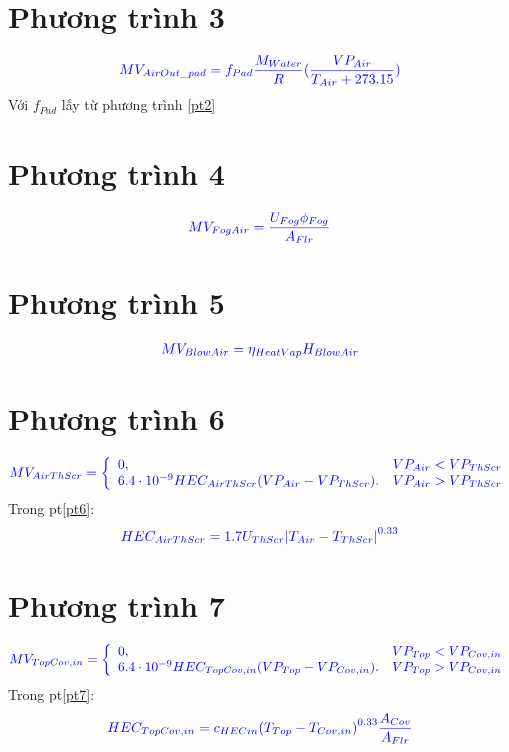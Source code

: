 \documentclass[13pt,a4paper]{article}
\begin{document}
	\section{Phương trình 3}
		\begin{align}
			\color{blue}
				MV_{AirOut\_pad} = f_{Pad}\frac{M_{Water}}{R}(\dfrac{VP_{Air}}{T_{Air} + 273.15})
			\color{blue}
			\label{pt3}
		\end{align}
		Với $f_{Pad}$ lấy từ phương trình \ref{pt2}
	\section{Phương trình 4}
		\begin{align}
			\color{blue}
				MV_{FogAir} = \dfrac{U_{Fog}\phi_{Fog}}{A_{Flr}}
			\color{blue}
			\label{pt4}
		\end{align}
	\section{Phương trình 5}
		\begin{align}
			\color{blue}
				MV_{BlowAir} = \eta_{HeatVap}H_{BlowAir}
			\color{blue}
			\label{pt5}
		\end{align}
	\section{Phương trình 6}
		\begin{align}
			\color{blue}
				MV_{AirThScr} = \left\{\begin{array}{llr}
					0,& VP_{Air} < VP_{ThScr} \\
					6.4\cdot 10^{-9} HEC_{AirThScr}(VP_{Air} - VP_{ThScr}).& VP_{Air} > VP_{ThScr}
				\end{array}\right.
			\color{blue}
			\label{pt6}
		\end{align}
		Trong pt\ref{pt6}:
		\begin{align*}
			\color{blue}
				HEC_{AirThScr} = 1.7U_{ThScr}{|T_{Air} - T_{ThScr}|}^{0.33}
			\color{blue}
		\end{align*}
	\section{Phương trình 7}
		\begin{align}
			\color{blue}
				MV_{TopCov,in} = \left\{\begin{array}{llr}
					0,& VP_{Top} < VP_{Cov,in} \\
					6.4\cdot 10^{-9} HEC_{TopCov,in}(VP_{Top} - VP_{Cov,in}).& VP_{Top} > VP_{Cov,in}
			\end{array}\right.
			\color{blue}
			\label{pt7}
		\end{align}
		Trong pt\ref{pt7}:
		\begin{align*}
			\color{blue}
				HEC_{TopCov,in} = c_{HECin}{(T_{Top} - T_{Cov,in})}^{0.33}\frac{A_{Cov}}{A_{Flr}}
			\color{blue}
		\end{align*}
\end{document}
